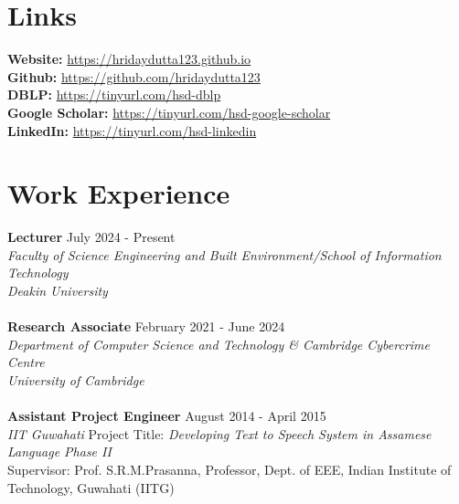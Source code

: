 \documentclass[margin, centered,lmodern]{res}
\begin{document}
\begin{resume}

\section{Links}
\textbf{Website:} \url{https://hridaydutta123.github.io} \\
\textbf{Github:} \url{https://github.com/hridaydutta123} \\
\textbf{DBLP:} \url{https://tinyurl.com/hsd-dblp} \\
\textbf{Google Scholar:} \url{https://tinyurl.com/hsd-google-scholar} \\
\textbf{LinkedIn:} \url{https://tinyurl.com/hsd-linkedin}
\section{Work Experience}
\textbf{Lecturer} \hfill July 2024 - Present\\
\emph{Faculty of Science Engineering and Built Environment/School of Information Technology \\
Deakin University
} \\
\\
\textbf{Research Associate} \hfill February 2021 - June 2024\\
\emph{Department of Computer Science and Technology \& Cambridge Cybercrime Centre \\
University of Cambridge
} \\
\\
\textbf{Assistant Project Engineer} \hfill August 2014 - April 2015 \\
\emph{IIT Guwahati}
Project Title: \textit{Developing Text to Speech System in Assamese Language Phase II} \\
Supervisor: Prof. S.R.M.Prasanna, Professor, Dept. of EEE, Indian Institute of Technology, Guwahati (IITG)




\end{resume}
\end{document}
